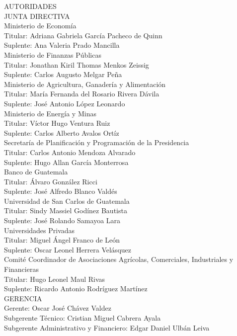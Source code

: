 {\Bold \LARGE AUTORIDADES}\\[1cm]
{\Bold \large \color{color1!89!black} JUNTA  DIRECTIVA} \\[0.4cm]
{\Bold Ministerio de Economía}\\ 
Titular: Adriana Gabriela García Pacheco de Quinn\\ 
Suplente: Ana Valeria Prado Mancilla\\[0.4cm]

{\Bold Ministerio de Finanzas Públicas}\\ 
Titular: Jonathan Kiril Thomas Menkos Zeissig\\ 
Suplente:  Carlos Augusto Melgar Peña\\[0.4cm]

{\Bold Ministerio de Agricultura, Ganadería y Alimentación}\\ 
Titular: María Fernanda del Rosario Rivera Dávila\\ 
Suplente: José Antonio López Leonardo\\[0.4cm]

{\Bold Ministerio de Energía y Minas}\\ 
Titular: Víctor Hugo Ventura Ruiz\\ 
Suplente: Carlos Alberto Avalos Ortíz\\[0.4cm]

{\Bold Secretaría de Planificación y Programación de la Presidencia}\\ 
Titular: Carlos Antonio Mendoza Alvarado\\ 
Suplente: Hugo Allan García Monterrosa\\[0.4cm]

{\Bold Banco de Guatemala}\\ 
Titular: Álvaro González Ricci \\ 
Suplente: José Alfredo Blanco Valdés\\[0.4cm]

{\Bold Universidad de San Carlos de Guatemala}\\ 
Titular: Sindy Massiel Godínez Bautista\\ 
Suplente: José Rolando Samayoa Lara\\[0.4cm]

{\Bold Universidades Privadas}\\ 
Titular: Miguel Ángel Franco de León\\ 
Suplente: Oscar Leonel Herrera Velásquez\\[0.4cm]

{\Bold Comité Coordinador de Asociaciones Agrícolas, Comerciales, Industriales y Financieras}\\ 
Titular: Hugo Leonel Maul Rivas\\ 
Suplente: Ricardo Antonio Rodríguez Martínez\\[0.4cm]

{\Bold \large \color{color1!89!black} GERENCIA}\\[0.2cm]
Gerente: Oscar José Chávez Valdez\\
Subgerente Técnico: Cristian Miguel Cabrera Ayala\\ 
Subgerente Administrativo y Financiero: Edgar Daniel Ulbán Leiva\\ 